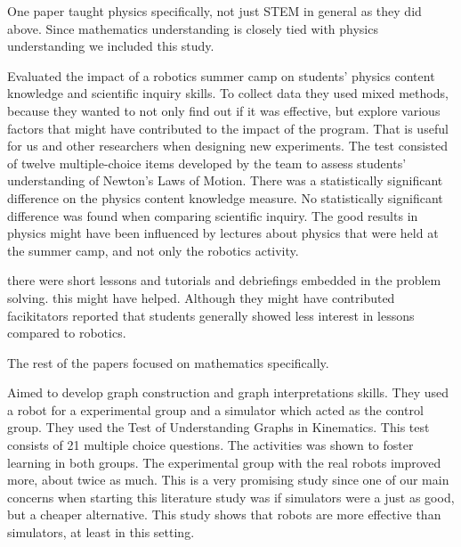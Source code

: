 \bigskip\noindent
One paper taught physics specifically, not just STEM in general as they did above. Since mathematics understanding is closely tied with physics understanding we included this study.

\bigskip\noindent
\cite{williams2007acquisition} Evaluated the impact of a robotics summer camp on students' physics content knowledge and scientific inquiry skills. To collect data they used mixed methods, because they wanted to not only find out if it was effective, but explore various factors that might have contributed to the impact of the program. That is useful for us and other researchers when designing new experiments. The test consisted of twelve multiple-choice items developed by the team to assess students' understanding of Newton's Laws of Motion. There was a statistically significant difference on the physics content knowledge measure. No statistically significant difference was found when comparing scientific inquiry. The good results in physics might have been influenced by lectures about physics that were held at the summer camp, and not only the robotics activity. 

\bigskip\noindent
\cite{williams2007acquisition} there were short lessons and tutorials and debriefings embedded in the problem solving. this might have helped. Although they might have contributed facikitators reported that students generally showed less interest in lessons compared to robotics. 

\bigskip\noindent
The rest of the papers focused on mathematics specifically\cite{mitnik2009collaborative, norton2004using, lindh2007does, silk2011resources}.

\bigskip\noindent
\cite{mitnik2009collaborative} Aimed to develop graph construction and graph interpretations skills. They used a robot for a experimental group and a simulator which acted as the control group. They used the Test of Understanding Graphs in Kinematics. This test consists of 21 multiple choice questions. The activities was shown to foster learning in both groups. The experimental group with the real robots improved more, about twice as much. This is a very promising study since one of our main concerns when starting this literature study was if simulators were a just as good, but a cheaper alternative. This study shows that robots are more effective than simulators, at least in this setting. 

